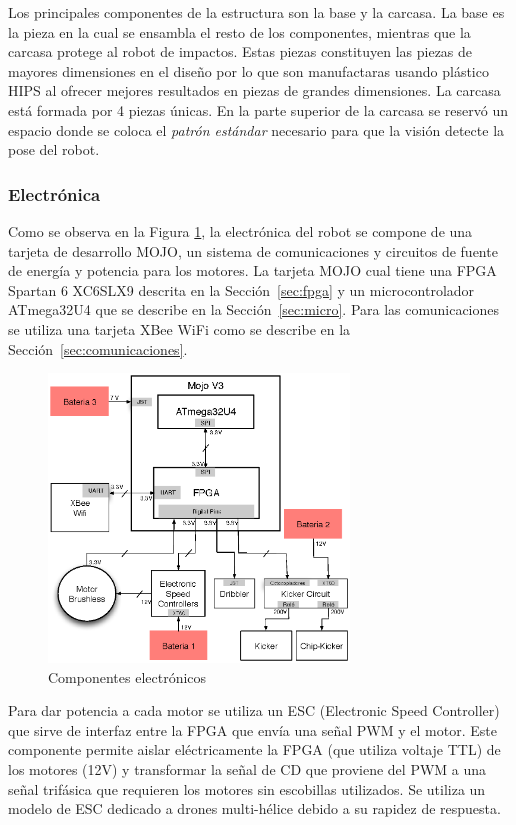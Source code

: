 \documentclass[twocolumn,10pt]{amrob}
\begin{document}
Los principales componentes de la estructura son la base y la carcasa. La base es la pieza en la cual se ensambla el resto de los componentes, mientras que la carcasa protege al robot de impactos. Estas piezas constituyen las piezas de mayores dimensiones en el diseño por lo que son manufactaras usando plástico HIPS al ofrecer mejores resultados en piezas de grandes dimensiones. La carcasa est\'a formada por 4 piezas \'unicas. En la parte superior de la carcasa se reservó un espacio donde se coloca el \textit{patrón estándar} necesario para que la visi\'on detecte la pose del robot.

\subsubsection*{Electrónica} Como se observa en la Figura \ref{fig:electGral}, la electrónica del robot se compone de una tarjeta de desarrollo MOJO, un sistema de comunicaciones y circuitos de fuente de energía y potencia para los motores. La tarjeta MOJO cual tiene una FPGA Spartan 6 XC6SLX9 descrita en la Sección~\ref{sec:fpga} y un microcontrolador ATmega32U4 que se describe en la Sección~\ref{sec:micro}. Para las comunicaciones se utiliza una tarjeta XBee WiFi como se describe en la Sección~\ref{sec:comunicaciones}. 
\begin{figure}
  \centering
    \includegraphics[width=8cm]{diagElectronica.eps}
  \caption{Componentes electrónicos}
  \label{fig:electGral}
\end{figure}


Para dar potencia a cada motor se utiliza un ESC (Electronic Speed Controller) que sirve de interfaz entre la FPGA que envía una señal PWM y el motor. Este componente permite aislar eléctricamente la FPGA (que utiliza voltaje TTL) de los motores (12V) y transformar la señal de CD que proviene del PWM a una señal trifásica que requieren los motores sin escobillas utilizados. Se utiliza un modelo de ESC dedicado a drones multi-hélice debido a su rapidez de respuesta. 
\end{document}
